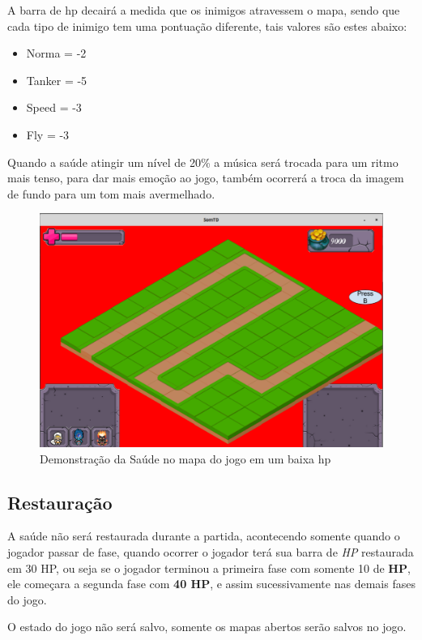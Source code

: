 \documentclass[11pt]{article} %
\begin{document}
A barra de hp decairá a medida que os inimigos atravessem o mapa, sendo que cada tipo de inimigo tem uma pontuação diferente, tais valores são estes abaixo:

\begin{itemize}
 \item Norma = -2 
 \item Tanker = -5
 \item Speed = -3
 \item Fly = -3
 \end{itemize} 

Quando a saúde atingir um nível de 20\% a música será trocada para um ritmo mais tenso, para dar mais emoção ao jogo, também ocorrerá a troca da imagem de fundo para um tom mais avermelhado.

\begin{figure}[!htp]
\centering
\includegraphics[scale=0.3]{res/danger.png}
\caption{Demonstração da Saúde no mapa do jogo em um baixa hp}
\label{Saúde}
\end{figure}

\subsection{Restauração}
A saúde não será restaurada durante a partida, acontecendo somente quando o jogador passar de fase, quando ocorrer o jogador terá sua barra de \textit{HP} restaurada em 30 HP, ou seja se o jogador terminou a primeira fase com somente 10 de \textbf{HP}, ele começara a segunda fase com \textbf{40 HP}, e assim sucessivamente nas demais fases do jogo.  

O estado do jogo não será salvo, somente os mapas abertos serão salvos no jogo.
\end{document}
